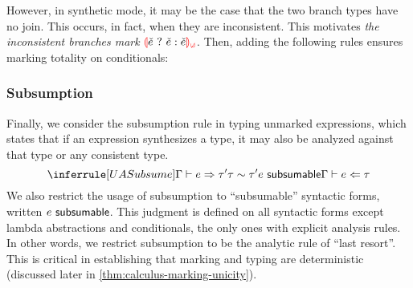 However, in synthetic mode, it may be the case that the two branch types have no join. This occurs,
in fact, when they are inconsistent. This motivates \emph{the inconsistent branches mark}
$\ECInconBr{\ECMV}{\ECMV}{\ECMV}$. Then, adding the following rules ensures marking totality on
conditionals:
%
\begin{mathpar}

\end{mathpar}

\subsubsection{Subsumption}
\label{sec:calculus-subsumption}

Finally, we consider the subsumption rule in typing unmarked expressions, which states that if an
expression synthesizes a type, it may also be analyzed against that type or any consistent type.
\[%
  \judgment{
    \ctxSynType{\ctx}{\EMV}{\TMV'} \\
    \consistent{\TMV}{\TMV'} \\
    \subsumable{\EMV}
  }{
    \ctxAnaType{\ctx}{\EMV}{\TMV}
  }{UASubsume}
\]%
We also restrict the usage of subsumption to ``subsumable'' syntactic forms, written
$\subsumable{\EMV}$. This judgment is defined on all syntactic forms except lambda abstractions and
conditionals, the only ones with explicit analysis rules. In other words, we restrict
subsumption to be the analytic rule of ``last resort''. This is critical in establishing that
marking and typing are deterministic (discussed later in \cref{thm:calculus-marking-unicity}).

